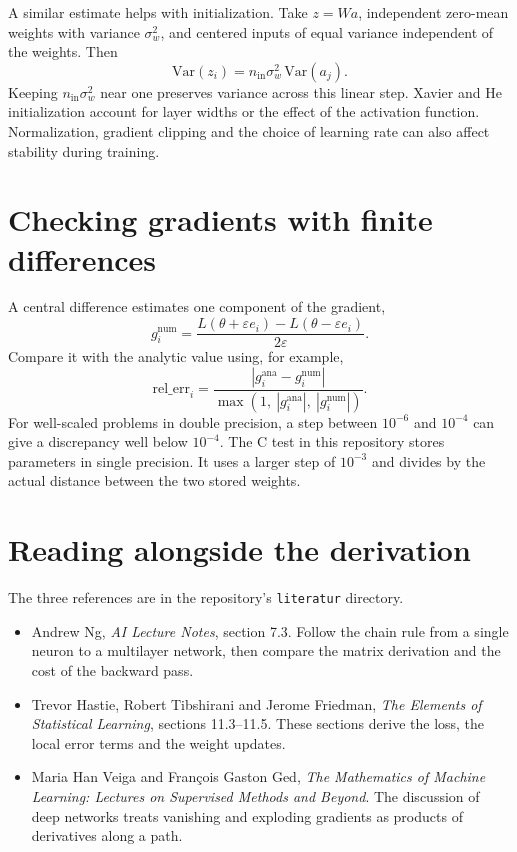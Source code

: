 \documentclass[11pt,a4paper]{article}
\begin{document}
A similar estimate helps with initialization. Take $z=Wa$, independent
zero-mean weights with variance $\sigma_w^2$, and centered inputs of equal
variance independent of the weights. Then
\[
\mathrm{Var}(z_i)=n_{\mathrm{in}}\sigma_w^2\,\mathrm{Var}(a_j).
\]
Keeping $n_{\mathrm{in}}\sigma_w^2$ near one preserves variance across this
linear step. Xavier and He initialization account for layer widths or the
effect of the activation function. Normalization, gradient clipping and the
choice of learning rate can also affect stability during training.

\section{Checking gradients with finite differences}
A central difference estimates one component of the gradient,
\[
g_i^{\mathrm{num}}=
\frac{L(\theta+\varepsilon e_i)-L(\theta-\varepsilon e_i)}{2\varepsilon}.
\]
Compare it with the analytic value using, for example,
\[
\mathrm{rel\_err}_i=
\frac{|g_i^{\mathrm{ana}}-g_i^{\mathrm{num}}|}
{\max(1,\ |g_i^{\mathrm{ana}}|,\ |g_i^{\mathrm{num}}|)}.
\]
For well-scaled problems in double precision, a step between $10^{-6}$ and
$10^{-4}$ can give a discrepancy well below $10^{-4}$. The C test in this
repository stores parameters in single precision. It uses a larger step of
$10^{-3}$ and divides by the actual distance between the two stored weights.

\section{Reading alongside the derivation}
The three references are in the repository's \texttt{literatur} directory.
\begin{itemize}
  \item Andrew Ng, \textit{AI Lecture Notes}, section 7.3. Follow the chain rule
    from a single neuron to a multilayer network, then compare the matrix
    derivation and the cost of the backward pass.
  \item Trevor Hastie, Robert Tibshirani and Jerome Friedman,
    \textit{The Elements of Statistical Learning}, sections 11.3--11.5.
    These sections derive the loss, the local error terms and the weight updates.
  \item Maria Han Veiga and Fran\c{c}ois Gaston Ged,
    \textit{The Mathematics of Machine Learning: Lectures on Supervised Methods and Beyond}.
    The discussion of deep networks treats vanishing and exploding gradients
    as products of derivatives along a path.
\end{itemize}
\end{document}
